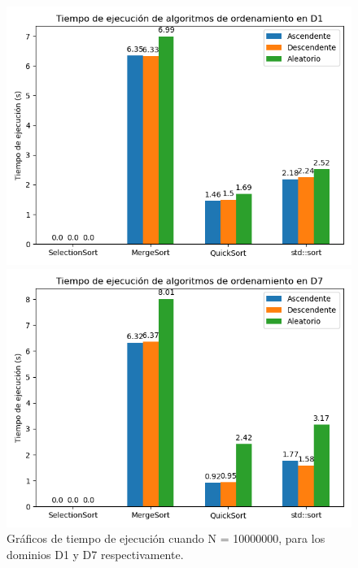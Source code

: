 \begin{figure}[H]
    \centering
    \begin{minipage}[t]{0.5\textwidth}
        \includegraphics[width=\textwidth]{../code/sorting/data/plots/10000000_D1.png}
    \end{minipage}%
    \begin{minipage}[t]{0.5\textwidth}
        \includegraphics[width=\textwidth]{../code/sorting/data/plots/10000000_D7.png}
     \end{minipage}%
    \caption{Gráficos de tiempo de ejecución cuando N = 10000000, para los dominios D1 y D7 respectivamente.}
    \label{fig:sortingN10000000}
\end{figure}

